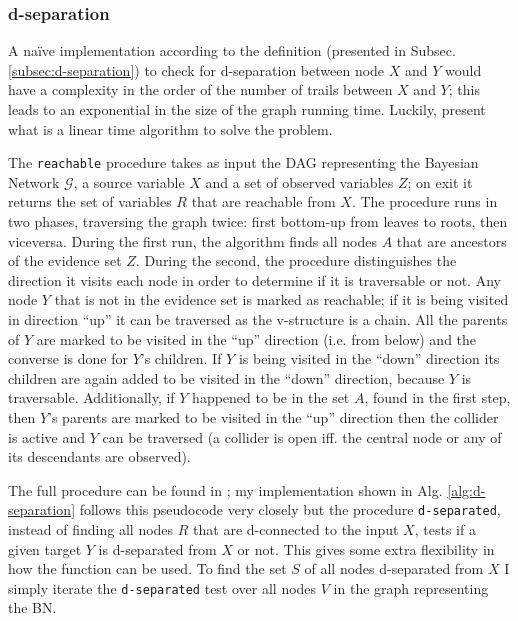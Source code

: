 \subsubsection{d-separation}
A na{\"i}ve implementation according to the definition (presented in Subsec. \ref{subsec:d-separation}) to check for d-separation between node $X$ and $Y$ would have a complexity in the order of the number of trails between $X$ and $Y$; this leads to an exponential in the size of the graph running time.
Luckily, \cite{koller2007dseparation} present what is a linear time algorithm to solve the problem.

The \texttt{reachable} procedure takes as input the DAG representing the Bayesian Network $\mathcal{G}$, a source variable $X$ and a set of observed variables $Z$; on exit it returns the set of variables $R$ that are reachable from $X$.
The procedure runs in two phases, traversing the graph twice: first bottom-up from leaves to roots, then viceversa.
During the first run, the algorithm finds all nodes $A$ that are ancestors of the evidence set $Z$.
During the second, the procedure distinguishes the direction it visits each node in order to determine if it is traversable or not.
Any node $Y$ that is not in the evidence set is marked as reachable; if it is being visited in direction \enquote{up} it can be traversed as the v-structure is a chain.
All the parents of $Y$ are marked to be visited in the \enquote{up} direction (i.e. from below) and the converse is done for $Y$'s children.
If $Y$ is being visited in the \enquote{down} direction its children are again added to be visited in the \enquote{down} direction, because $Y$ is traversable.
Additionally, if $Y$ happened to be in the set $A$, found in the first step, then $Y$'s parents are marked to be visited in the \enquote{up} direction then the collider is active and $Y$ can be traversed (a collider is open iff. the central node or any of its descendants are observed).

The full procedure can be found in \cite{koller2007dseparation}; my implementation shown in Alg. \ref{alg:d-separation} follows this pseudocode very closely but the procedure \texttt{d-separated}, instead of finding all nodes $R$ that are d-connected to the input $X$, tests if a given target $Y$ is d-separated from $X$ or not.
This gives some extra flexibility in how the function can be used.
To find the set $S$ of all nodes d-separated from $X$ I simply iterate the \texttt{d-separated} test over all nodes $V$ in the graph representing the BN.

